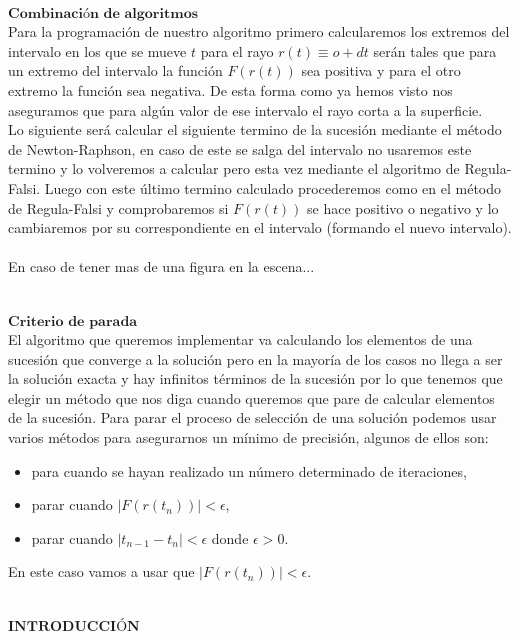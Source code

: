 ${ }$\\
$\textbf{Combinación de algoritmos}$
${ }$\\

Para la programación de nuestro algoritmo primero calcularemos los extremos del intervalo en los que se mueve $t$ para el rayo $r(t) \equiv o + dt$ serán tales que para un extremo del intervalo la función $F(r(t))$ sea positiva y para el otro extremo la función sea negativa. De esta forma como ya hemos visto nos aseguramos que para algún valor de ese intervalo el rayo corta a la superficie.
${ }$\\

Lo siguiente será calcular el siguiente termino de la sucesión mediante el método de Newton-Raphson, en caso de este se salga del intervalo no usaremos este termino y lo volveremos a calcular pero esta vez mediante el algoritmo de Regula-Falsi. Luego con este último termino calculado procederemos como en el método de Regula-Falsi y comprobaremos si $F(r(t))$ se hace positivo o negativo y lo cambiaremos por su correspondiente en el intervalo (formando el nuevo intervalo).
${ }$\\

En caso de tener mas de una figura en la escena...


${ }$\\
$\textbf{Criterio de parada}$
${ }$\\

El algoritmo que queremos implementar va calculando los elementos de una sucesión que converge a la solución pero en la mayoría de los casos no llega a ser la solución exacta y hay infinitos términos de la sucesión por lo que tenemos que elegir un método que nos diga cuando queremos que pare de calcular elementos de la sucesión. Para parar el proceso de selección de una solución podemos usar varios métodos para asegurarnos un mínimo de precisión, algunos de ellos son:
\begin{itemize}
	\item para cuando se hayan realizado un número determinado de iteraciones,
	\item parar cuando $|F(r(t_n))| < \epsilon$,
	\item parar cuando $|t_{n-1} - t_n| < \epsilon$ donde $\epsilon > 0$.
\end{itemize}
En este caso vamos a usar que $|F(r(t_n))| < \epsilon$.


${ }$\\
$\textbf{INTRODUCCIÓN}$
${ }$\\

